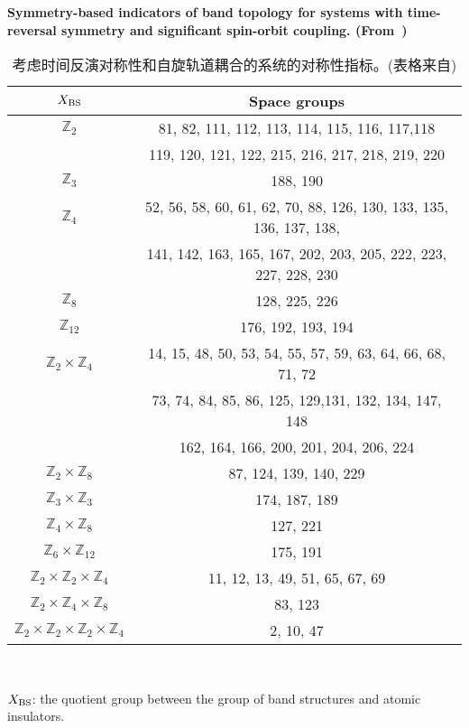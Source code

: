 \begin{table}[h]\small
    \centering
    \caption{考虑时间反演对称性和自旋轨道耦合的系统的对称性指标。(表格来自\citep{nc_ashvin})}
    {\bf Symmetry-based indicators of band topology for systems with time-reversal symmetry and significant spin-orbit coupling. (From~\citep{nc_ashvin})
    \label{tab:Spinful_TRX}}
    \begin{tabular}{c c} \hline 
    $X_{\rm BS}$ & Space groups \\
    \hline
    $\mathbb Z_{2}$  &  81, 82, 111, 112, 113, 114, 115, 116, 117,118\\
     &119, 120, 121, 122, 215, 216, 217, 218, 219, 220\\
    $\mathbb Z_{3}$  &  188, 190\\
    $\mathbb Z_{4}$  &  52, 56, 58, 60, 61, 62, 70, 88, 126, 130, 133, 135, 136, 137, 138,\\
                     &  141, 142, 163, 165, 167, 202, 203, 205, 222, 223, 227, 228, 230\\
    $\mathbb Z_{8}$  &  128, 225, 226\\
    $\mathbb Z_{12}$  &  176, 192, 193, 194\\
    $\mathbb Z_{2} \times \mathbb Z_{4}$  &  14, 15, 48, 50, 53, 54, 55, 57, 59, 63, 64, 66, 68, 71, 72\\
    & 73, 74, 84, 85, 86, 125, 129,131, 132, 134, 147, 148\\
     & 162, 164, 166, 200, 201, 204, 206, 224\\
    $\mathbb Z_{2} \times \mathbb Z_{8}$  &  87, 124, 139, 140, 229\\
    $\mathbb Z_{3} \times \mathbb Z_{3}$  &  174, 187, 189\\
    $\mathbb Z_{4} \times \mathbb Z_{8}$  &  127, 221\\
    $\mathbb Z_{6} \times \mathbb Z_{12}$  &  175, 191\\
    $\mathbb Z_{2} \times \mathbb Z_{2} \times \mathbb Z_{4}$  &  11, 12, 13, 49, 51, 65, 67, 69\\
    $\mathbb Z_{2} \times \mathbb Z_{4} \times \mathbb Z_{8}$  &  83, 123\\
    $\mathbb Z_{2} \times \mathbb Z_{2} \times \mathbb Z_{2} \times \mathbb Z_{4}$  &  2, 10, 47\\
    \hline
    \end{tabular}\\
    \begin{flushleft}
    $X_{\rm BS}$: the quotient group between the group of band structures and atomic insulators.
    \end{flushleft}
\end{table}

